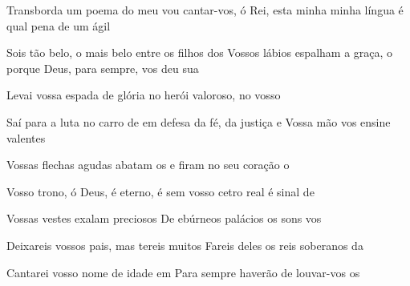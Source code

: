\begin{greenumerate}
  \item {}Transborda um poema do meu  vou cantar-vos, ó Rei, esta minha  minha língua é qual pena de um ágil 

  \item {}Sois tão belo, o mais belo entre os filhos dos  Vossos lábios espalham a graça, o  porque Deus, para sempre, vos deu sua 

  \item {}Levai vossa espada de glória no  herói valoroso, no vosso 

  \item {}Saí para a luta no carro de  em defesa da fé, da justiça e  Vossa mão vos ensine valentes 

  \item {}Vossas flechas agudas abatam os  e firam no seu coração o 

  \item {}Vosso trono, ó Deus, é eterno, é sem  vosso cetro real é sinal de 

  \item {}Vossas vestes exalam preciosos  De ebúrneos palácios os sons vos 

  \item {}Deixareis vossos pais, mas tereis muitos  Fareis deles os reis soberanos da 

  \item {}Cantarei vosso nome de idade em  Para sempre haverão de louvar-vos os 
\end{greenumerate}